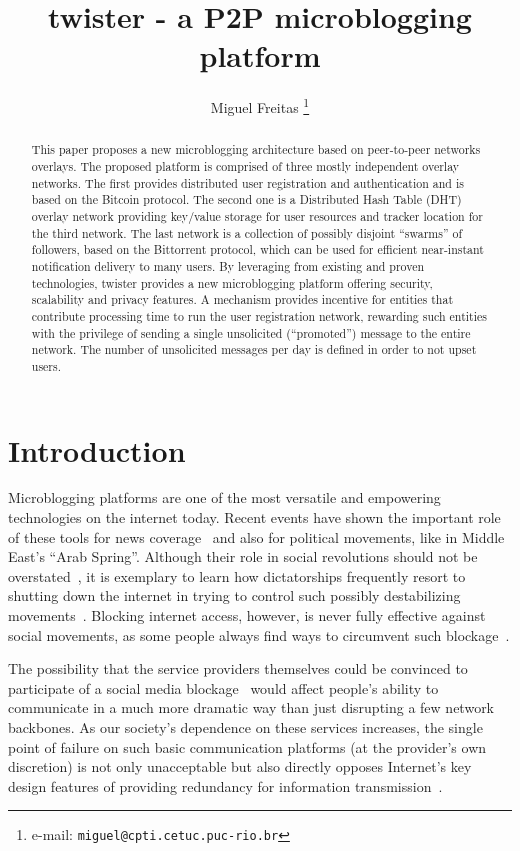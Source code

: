 \documentclass[a4paper,10pt]{article}
\title{twister - a P2P microblogging platform}
\author{Miguel Freitas%
  \thanks{e-mail: \texttt{miguel@cpti.cetuc.puc-rio.br}}}
\affil{Center for Research in Inspection Tecnology (CPTI)\\
        Pontifical Catholic University of Rio de Janeiro (PUC-Rio), Brazil}
\begin{document}
\maketitle

\begin{abstract}

This paper proposes a new microblogging architecture based on peer-to-peer networks overlays. The proposed platform is comprised of three mostly independent overlay networks. The first provides distributed user registration and authentication and is based on the Bitcoin protocol. The second one is a Distributed Hash Table (DHT) overlay network providing key/value storage for user resources and tracker location for the third network. The last network is a collection of possibly disjoint ``swarms'' of followers, based on the Bittorrent protocol, which can be used for efficient near-instant notification delivery to many users. By leveraging from existing and proven technologies, twister provides a new microblogging platform offering security, scalability and privacy features. A mechanism provides incentive for entities that contribute processing time to run the user registration network, rewarding such entities with the privilege of sending a single unsolicited (``promoted'') message to the entire network. The number of unsolicited messages per day is defined in order to not upset users.

\end{abstract}

\section{Introduction}

Microblogging platforms are one of the most versatile and empowering technologies on the internet today. Recent events have shown the important role of these tools for news coverage~\cite{sklar2009} and also for political movements, like in Middle East's ``Arab Spring''. Although their role in social revolutions should not be overstated~\cite{khondker2011role}, it is exemplary to learn how dictatorships frequently resort to shutting down the internet in trying to control such possibly destabilizing movements~\cite{glanz2011,warner2012}. Blocking internet access, however, is never fully effective against social movements, as some people always find ways to circumvent such blockage~\cite{dachis2011}.

The possibility that the service providers themselves could be convinced to participate of a social media blockage~\cite{halliday2011} would affect people's ability to communicate in a much more dramatic way than just disrupting a few network backbones. As our society's dependence on these services increases, the single point of failure on such basic communication platforms (at the provider's own discretion) is not only unacceptable but also directly opposes Internet's key design features of providing redundancy for information transmission~\cite{wikipediainternet}.
\end{document}
